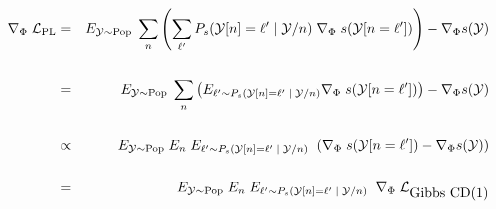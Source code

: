 {\huge
\begin{eqnarray*}
\nabla_\Phi\;{\cal L}_{\mathrm{PL}} & = & E_{{\cal Y} \sim \mathrm{Pop}}\;\sum_n \left(\sum_{\ell'} P_s({\cal Y}[n]=\ell'\;|\;{\cal Y}/n)\; \nabla_\Phi\;s({\cal Y}[n=\ell'])\right) - \nabla_\Phi s({\cal Y}) \\
\\
& = & E_{{\cal Y} \sim \mathrm{Pop}}\;\sum_n \left(E_{\ell' \sim P_s({\cal Y}[n]=\ell'\;|\;{\cal Y}/n)} \nabla_\Phi\;s({\cal Y}[n=\ell'])\right) - \nabla_\Phi s({\cal Y}) \\
\\
& \propto & E_{{\cal Y} \sim \mathrm{Pop}}\;E_n\;  E_{\ell' \sim P_s({\cal Y}[n]=\ell'\;|\;{\cal Y}/n)}\;\; (\nabla_\Phi\;s({\cal Y}[n=\ell']) - \nabla_\Phi s({\cal Y})) \\
\\
& = & E_{{\cal Y} \sim \mathrm{Pop}}\;E_n\; E_{\ell' \sim P_s({\cal Y}[n]=\ell'\;|\;{\cal Y}/n)}\;\; \nabla_\Phi\;{\cal L}_{\mbox{Gibbs CD(1)}}
\end{eqnarray*}
}
